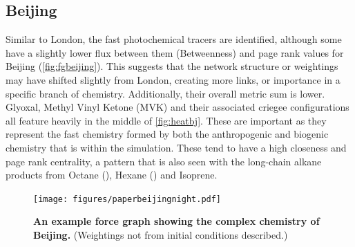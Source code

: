 \subsection*{Beijing}


Similar to London, the fast photochemical tracers are identified, although some have a slightly lower flux between them (Betweenness) and page rank values for Beijing (\autoref{fig:fgbeijing}). This suggests that the network structure or weightings may have shifted slightly from London, creating more links, or importance in a specific branch of chemistry.
 Additionally, their overall metric sum is lower. Glyoxal, Methyl Vinyl Ketone (MVK) and their associated criegee configurations all feature heavily in the middle of \autoref{fig:heatbj}. These are important as they represent the fast chemistry formed by both the anthropogenic and biogenic chemistry that is within the simulation. These tend to have a high closeness and page rank centrality, a pattern that is also seen with the long-chain alkane products from Octane (), Hexane () and Isoprene.

 \begin{figure}[H]
      \centering
          \texttt{[image: figures/paperbeijingnight.pdf]}
         \caption{ \textbf{An example force graph showing the complex chemistry of Beijing.} (Weightings not from initial conditions described.)}
         \label{fig:fgbeijing}
 \end{figure}
%

